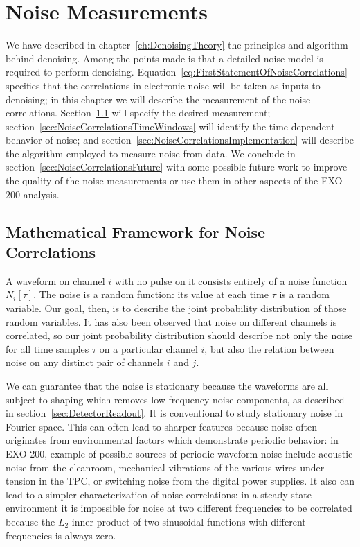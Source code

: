 
\renewcommand{\thechapter}{4}
\chapter{Noise Measurements}
\label{ch:NoiseMeasurements}

We have described in chapter~\ref{ch:DenoisingTheory} the principles and algorithm behind denoising.  Among the points made is that a detailed noise model is required to perform denoising.  Equation~\ref{eq:FirstStatementOfNoiseCorrelations} specifies that the correlations in electronic noise will be taken as inputs to denoising; in this chapter we will describe the measurement of the noise correlations.  Section~\ref{sec:NoiseCorrelationsMath} will specify the desired measurement; section~\ref{sec:NoiseCorrelationsTimeWindows} will identify the time-dependent behavior of noise; and section~\ref{sec:NoiseCorrelationsImplementation} will describe the algorithm employed to measure noise from data.  We conclude in section~\ref{sec:NoiseCorrelationsFuture} with some possible future work to improve the quality of the noise measurements or use them in other aspects of the EXO-200 analysis.

\section{Mathematical Framework for Noise Correlations}\label{sec:NoiseCorrelationsMath}

A waveform on channel $i$ with no pulse on it consists entirely of a noise function $N_i[\tau]$.  The noise is a random function:  its value at each time $\tau$ is a random variable.  Our goal, then, is to describe the joint probability distribution of those random variables.  It has also been observed that noise on different channels is correlated, so our joint probability distribution should describe not only the noise for all time samples $\tau$ on a particular channel $i$, but also the relation between noise on any distinct pair of channels $i$ and $j$.

We can guarantee that the noise is stationary because the waveforms are all subject to shaping which removes low-frequency noise components, as described in section~\ref{sec:DetectorReadout}.  It is conventional to study stationary noise in Fourier space.  This can often lead to sharper features because noise often originates from environmental factors which demonstrate periodic behavior: in EXO-200, example of possible sources of periodic waveform noise include acoustic noise from the cleanroom, mechanical vibrations of the various wires under tension in the TPC, or switching noise from the digital power supplies.  It also can lead to a simpler characterization of noise correlations: in a steady-state environment it is impossible for noise at two different frequencies to be correlated because the $L_2$ inner product of two sinusoidal functions with different frequencies is always zero.

